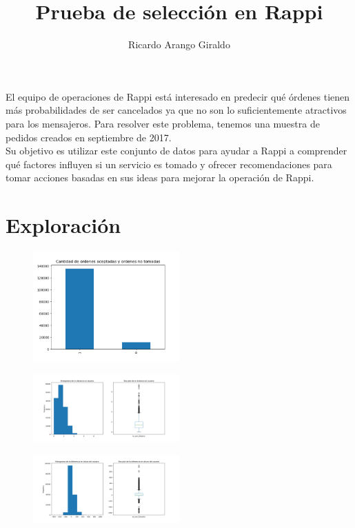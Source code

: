 \documentclass[10pt,a4paper]{article}
\author{Ricardo Arango Giraldo}
\title{Prueba de selección en Rappi}
\begin{document}
\maketitle
	El equipo de operaciones de Rappi está interesado en predecir qué órdenes tienen más probabilidades de ser cancelados ya que no son lo suficientemente atractivos para los mensajeros. Para resolver este problema, tenemos una muestra de pedidos creados en septiembre de 2017.\\
	Su objetivo es utilizar este conjunto de datos para ayudar a Rappi a comprender qué factores influyen si un servicio es tomado y ofrecer recomendaciones para tomar acciones basadas en sus ideas para mejorar la operación de Rappi.
	\section{Exploración}
		\begin{figure}[h]
			\centering
			\includegraphics[width=0.5\textwidth]{../Img/Figure_1}
		\end{figure}
		
		\begin{figure}[h]
			\centering
			\includegraphics[width=0.5\textwidth]{../Img/to_user_distance}
		\end{figure}
	
		\begin{figure}[h]
			\centering
			\includegraphics[width=0.5\textwidth]{../Img/to_user_elevation}
		\end{figure}
	
\end{document}
